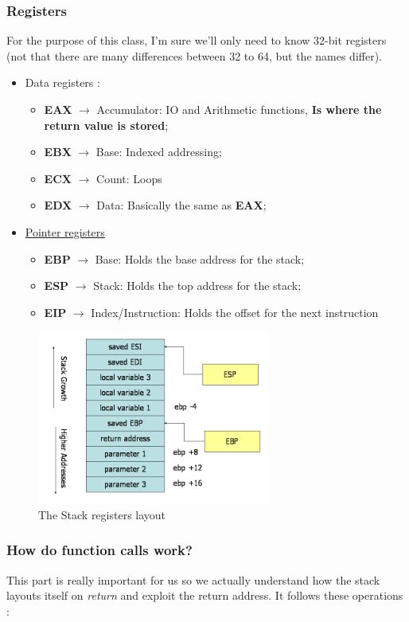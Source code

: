 \documentclass[11pt]{article}
\begin{document}
{\subsubsection{Registers}
\label{sec:org7301d9c}
For the purpose of this class, I'm sure we'll only need to know 32-bit registers (not that there are many differences between 32 to 64, but the names differ).
\begin{itemize}
\item Data registers \cite{evans_guide_nodate}:
\begin{itemize}
\item \textbf{EAX} \(\to\) Accumulator: IO and Arithmetic functions, \textbf{Is where the return value is stored};
\item \textbf{EBX} \(\to\) Base: Indexed addressing;
\item \textbf{ECX} \(\to\) Count: Loops
\item \textbf{EDX} \(\to\) Data: Basically the same as \textbf{EAX};
\end{itemize}
\item \hyperref[StackReg]{Pointer registers}
\begin{itemize}
\item \textbf{EBP} \(\to\) Base: Holds the base address for the stack;
\item \textbf{ESP} \(\to\) Stack: Holds the top address for the stack;
\item \textbf{EIP} \(\to\) Index/Instruction: Holds the offset for the next instruction
\end{itemize}
\end{itemize}

\begin{figure}[htbp]
\centering
\includegraphics[width=3in]{res/stack-convention.png}
\caption{\label{StackReg}
The Stack registers layout}
\end{figure}

\subsubsection{How do function calls work?}
\label{sec:org9c80fc7}
This part is really important for us so we actually understand how the stack layouts itself on \emph{return} and exploit the return address. It follows these operations \cite{hu_understanding_nodate}:

}
\end{document}
